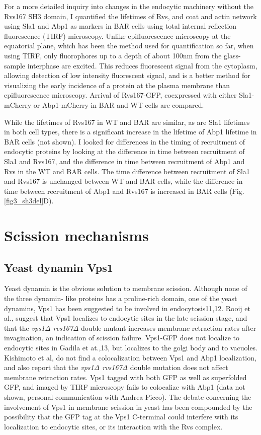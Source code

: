 For a more detailed inquiry into changes in the endocytic machinery without the Rvs167 SH3 domain, I quantified the lifetimes of Rvs, and coat and actin network using Sla1 and Abp1 as markers in BAR cells using total internal reflection fluorescence (TIRF) microscopy. Unlike epifluorescence microscopy at the equatorial plane, which has been the method used for quantification so far, when using TIRF, only fluorophores up to a depth of about 100nm from the glass-sample interphase are excited. This reduces fluorescent signal from the cytoplasm, allowing detection of low intensity fluorescent signal, and is a better method for visualizing the early incidence of a protein at the plasma membrane than epifluorescence microscopy. Arrival of Rvs167-GFP, coexpressed with either Sla1-mCherry or Abp1-mCherry in BAR and WT cells are compared. 

	
	\vspace{5mm}
While the lifetimes of Rvs167 in WT and BAR are similar, as are Sla1 lifetimes in both cell types, there is a significant increase in the lifetime of Abp1 lifetime in BAR cells (not shown). I looked for differences in the timing of recruitment of endocytic proteins by looking at the difference in time between recruitment of Sla1 and Rvs167, and the difference in time between recruitment of Abp1 and Rvs in the WT and BAR cells. The time difference between recruitment of Sla1 and Rvs167 is unchanged between WT and BAR cells, while the difference in time between recruitment of Abp1 and Rvs167 is increased in BAR cells (Fig.\ref{fig3_sh3del}D).


		
\section{Scission mechanisms}

	\subsection{Yeast dynamin Vps1}
	
	Yeast dynamin is the obvious solution to membrane scission. Although none of the three dynamin- like proteins has a proline-rich domain, one of the yeast dynamins, Vps1 has been suggested to be involved in endocytosis11,12. Rooij et al., suggest that Vps1 localizes to endocytic sites in the late scission stage, and that the \textit{vps1Δ rvs167Δ} double mutant increases membrane retraction rates after invagination, an indication of scission failure. Vps1-GFP does not localize to endocytic sites in Gadila et at.,13, but localizes to the golgi body and to vacuoles. Kishimoto et al, do not find a colocalization between Vps1 and Abp1 localization, and also report that the \textit{vps1Δ rvs167Δ}  double mutation does not affect membrane retraction rates. Vps1 tagged with both GFP as well as superfolded GFP, and imaged by TIRF microscopy fails to colocalize with Abp1 (data not shown, personal communication with Andrea Picco). The debate concerning the involvement of Vps1 in membrane scission in yeast has been compounded by the possibility that the GFP tag at the Vps1 C-terminal could interfere with its localization to endocytic sites, or its interaction with the Rvs complex. 
	
